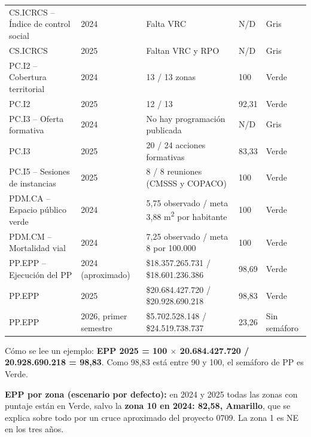 \documentclass[11pt,letterpaper]{article}
\begin{document}
{\begin{xltabular}{\linewidth}{L{3.94cm}L{2.87cm}L{4.19cm}L{1.90cm}L{2.58cm}}
CS.ICRCS -- Índice de control social & 2024 & Falta VRC & N/D & Gris \\
CS.ICRCS & 2025 & Faltan VRC y RPO & N/D & Gris \\
PC.I2 -- Cobertura territorial & 2024 & 13 / 13 zonas & 100 & Verde \\
PC.I2 & 2025 & 12 / 13 & 92,31 & Verde \\
PC.I3 -- Oferta formativa & 2024 & No hay programación publicada & N/D & Gris \\
PC.I3 & 2025 & 20 / 24 acciones formativas & 83,33 & Verde \\
PC.I5 -- Sesiones de instancias & 2025 & 8 / 8 reuniones (CMSSS y COPACO) & 100 & Verde \\
PDM.CA -- Espacio público verde & 2024 & 5,75 observado / meta 3,88 m\textsuperscript{2} por habitante & 100 & Verde \\
PDM.CM -- Mortalidad vial & 2024 & 7,25 observado / meta 8 por 100.000 & 100 & Verde \\
PP.EPP -- Ejecución del PP & 2024 (aproximado) & \$18.357.265.731 / \$18.601.236.386 & 98,69 & Verde \\
PP.EPP & 2025 & \$20.684.427.720 / \$20.928.690.218 & 98,83 & Verde \\
PP.EPP & 2026, primer semestre & \$5.702.528.148 / \$24.519.738.737 & 23,26 & Sin semáforo \\
\end{xltabular}
}

Cómo se lee un ejemplo: \textbf{EPP 2025 = 100 $\times$ 20.684.427.720 / 20.928.690.218 = 98,83}. Como 98,83 está entre 90 y 100, el semáforo de PP es Verde.

\textbf{EPP por zona (escenario por defecto):} en 2024 y 2025 todas las zonas con puntaje están en Verde, salvo la \textbf{zona 10 en 2024: 82,58, Amarillo}, que se explica sobre todo por un cruce aproximado del proyecto 0709. La zona 1 es NE en los tres años.
\end{document}
